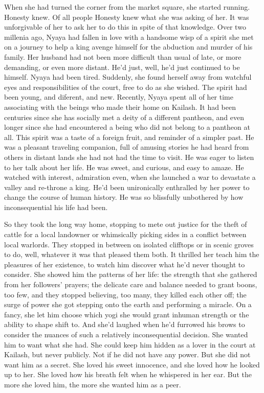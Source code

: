 \documentclass{amsart}
\begin{document}
When she had turned the corner from the market square, she started running. Honesty knew. Of all people Honesty knew what she was asking of her. It was unforgivable of her to ask her to do this in spite of that knowledge. Over two millenia ago, Nyaya had fallen in love with a handsome wisp of a spirit she met on a journey to help a king avenge himself for the abduction and murder of his family. Her husband had not been more difficult than usual of late, or more demanding, or even more distant. He'd just, well, he'd just continued to be himself. Nyaya had been tired. Suddenly, she found herself away from watchful eyes and responsibilities of the court, free to do as she wished. The spirit had been young, and diferent, and new. Recently, Nyaya spent all of her time associating with the beings who made their home on Kailash. It had been centuries since she has socially met a deity of a different pantheon, and even longer since she had encountered a being who did not belong to a pantheon at all. This spirit was a taste of a foreign fruit, and reminder of a simpler past. He was a pleasant traveling companion, full of amusing stories he had heard from others in distant lands she had not had the time to visit. He was eager to listen to her talk about her life. He was sweet, and curious, and easy to amaze. He watched with interest, admiration even, when she launched a war to devastate a valley and re-throne a king. He'd been unironically enthralled by her power to change the course of human history. He was so blissfully unbothered by how inconsequential his life had been.

So they took the long way home, stopping to mete out justice for the theft of cattle for a local landowner or whimsically picking sides in a conflict between local warlords. They stopped in between on isolated clifftops or in scenic groves to do, well, whatever it was that pleased them both. It thrilled her teach him the pleasures of her existence, to watch him discover what he'd never thought to consider. She showed him the patterns of her life: the strength that she gathered from her followers' prayers; the delicate care and balance needed to  grant boons, too few, and they stopped believing, too many, they killed each other off; the surge of power she got stepping onto the earth and performing a miracle. On a fancy, she let him choose which yogi she would grant inhuman strength or the ability to shape shift to. And she'd laughed when he'd furrowed his brows to consider the nuances of such a relatively inconsequential decision. She wanted him to want what she had. She could keep him hidden as a lover in the court at Kailash, but never publicly. Not if he did not have any power. But she did not want him as a secret. She loved his sweet innocence, and she loved how he looked up to her. She loved how his breath felt when he whispered in her ear. But the more she loved him, the more she wanted him as a peer. 
\end{document}
